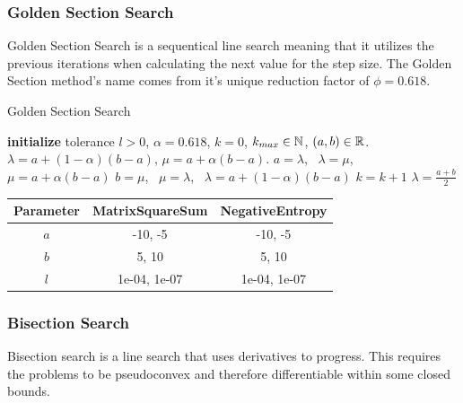 \documentclass[a4paper,english,titlepage,12pt]{article}
\newcommand{\R}{\ensuremath\mathbb{R}}
\newcommand{\N}{\ensuremath\mathbb{N}}
\begin{document}
\subsubsection{Golden Section Search}

Golden Section Search is a sequentical line search meaning that it utilizes the previous iterations when calculating the next value for the step size. The Golden Section method's name comes from it's unique reduction factor of $\phi = 0.618$. \cite{book:nonlinear_programming}

\begin{algorithm}[H]
\caption{Golden Section Search}
\label{alg_golden_section}
\begin{algorithmic}[1]
\STATE \textbf{initialize} tolerance $l > 0$, $\alpha = 0.618$, $k = 0$, $k_{max} \in \N$, $(a, b) \in \R$.
\STATE $\lambda = a + (1 - \alpha) (b - a)$, $\mu = a + \alpha (b - a)$.
    \IF{$\theta(\lambda) > \theta(\mu)$}
        \STATE $a = \lambda$, \ $\lambda = \mu$, \ $\mu = a + \alpha (b - a)$
    \ELSE
        \STATE $b = \mu$, \ $\mu = \lambda$, \ $\lambda = a + (1 - \alpha) (b - a)$
    \ENDIF
    \STATE $k = k + 1$
\ENDWHILE
\RETURN $\lambda = \frac{a + b}{2}$
\end{algorithmic}
\end{algorithm}

\begin{table}[H]
\label{tab:params_GoldenSectionSearch}
\centering
{}
\begin{tabular}{|c|c|c|}
\hline
\rowcolor{gray!25}
Parameter & MatrixSquareSum & NegativeEntropy \\
\hline
$a$ & -10, -5 & -10, -5 \\
$b$ & 5, 10 & 5, 10 \\
$l$ & 1e-04, 1e-07 & 1e-04, 1e-07 \\
\hline
\end{tabular}
\end{table}


\subsubsection{Bisection Search}


Bisection search is a line search that uses derivatives to progress. This requires the problems to be pseudoconvex and therefore differentiable within some closed bounds. \cite{book:nonlinear_programming}
\end{document}
